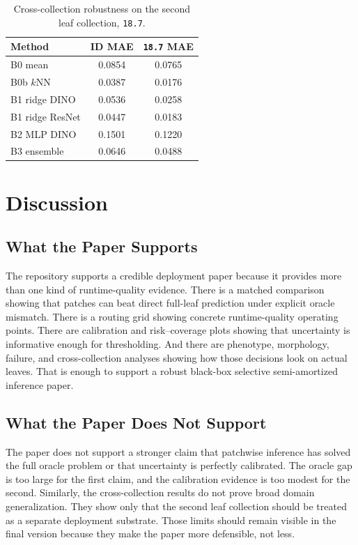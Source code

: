 \documentclass[11pt,a4paper]{article}
\begin{document}
\begin{table}[H]
\centering
\caption{Cross-collection robustness on the second leaf collection, \texttt{18.7}.}
\label{tab:oodB}
\small
\begin{tabular}{lcc}
\toprule
Method & ID MAE & \texttt{18.7} MAE \\
\midrule
B0 mean & 0.0854 & 0.0765 \\
B0b $k$NN & 0.0387 & 0.0176 \\
B1 ridge DINO & 0.0536 & 0.0258 \\
B1 ridge ResNet & 0.0447 & 0.0183 \\
B2 MLP DINO & 0.1501 & 0.1220 \\
B3 ensemble & 0.0646 & 0.0488 \\
\bottomrule
\end{tabular}
\end{table}

\section{Discussion}
\subsection{What the Paper Supports}
The repository supports a credible deployment paper because it provides more than one kind of runtime-quality evidence.
There is a matched comparison showing that patches can beat direct full-leaf prediction under explicit oracle mismatch.
There is a routing grid showing concrete runtime-quality operating points.
There are calibration and risk--coverage plots showing that uncertainty is informative enough for thresholding.
And there are phenotype, morphology, failure, and cross-collection analyses showing how those decisions look on actual leaves.
That is enough to support a robust black-box selective semi-amortized inference paper.

\subsection{What the Paper Does Not Support}
The paper does not support a stronger claim that patchwise inference has solved the full oracle problem or that uncertainty is perfectly calibrated.
The oracle gap is too large for the first claim, and the calibration evidence is too modest for the second.
Similarly, the cross-collection results do not prove broad domain generalization.
They show only that the second leaf collection should be treated as a separate deployment substrate.
Those limits should remain visible in the final version because they make the paper more defensible, not less.
\end{document}
